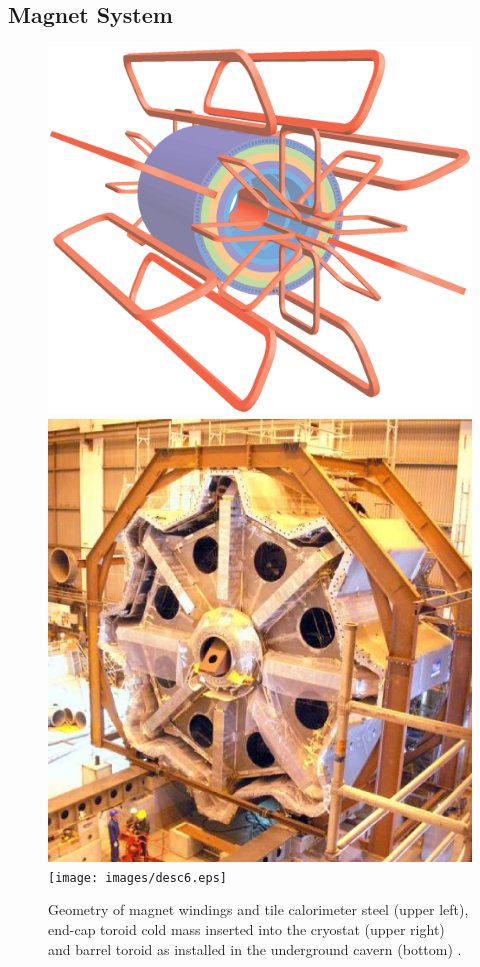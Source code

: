 	\subsection{Magnet System}

		\begin{figure}[h]
			\begin{center}
				\includegraphics[scale=0.3]{images/ATLcoilGeom.eps}
				\includegraphics[scale=0.3]{images/desc5.eps}\\
				\texttt{[image: images/desc6.eps]}
			\end{center}
			\caption{Geometry of magnet windings and tile calorimeter steel (upper left), end-cap toroid cold mass inserted into the cryostat (upper right) and barrel toroid as installed in the underground cavern (bottom) \cite{Aad:1129811}.}
			\label{fig:ATLAS_magnet}
		\end{figure}

